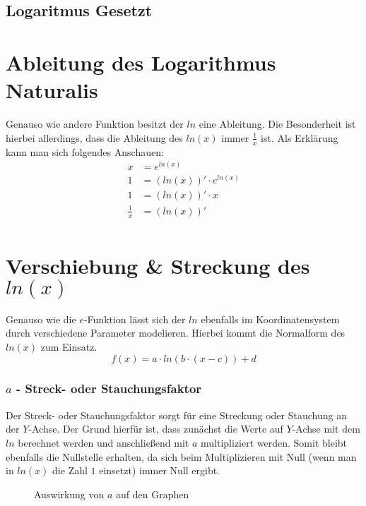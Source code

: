 \subsection{Logaritmus Gesetzt}
\pagebreak
\section{Ableitung des Logarithmus Naturalis}
Genauso wie andere Funktion besitzt der $ln$ eine Ableitung. Die Besonderheit ist hierbei allerdings, dass die Ableitung des $ln(x)$ immer $\frac{1}{x}$ ist. Als Erklärung kann man sich folgendes Anschauen:
\begin{align*}
	x&=e^{ln(x)}\tag{Ableiten auf beiden Seiten}\\
	1&=(ln(x))'\cdot e^{ln(x)}\tag{Beide Seiten vereinfachen}\\
	1&=(ln(x))'\cdot x\tag{Durch $x$ dividieren}\\
	\frac{1}{x}&=(ln(x))'\\	
\end{align*}
\section{Verschiebung \& Streckung des $ln(x)$}
Genauso wie die $e$-Funktion lässt sich der $ln$ ebenfalls im Koordinatensystem durch verschiedene Parameter modelieren. Hierbei kommt die Normalform des $ln(x)$ zum Einsatz.
\[f(x)=a\cdot ln(b\cdot(x-c))+d\]
\pagebreak
\subsubsection{$a$ - Streck- oder Stauchungsfaktor}
Der Streck- oder Stauchungsfaktor sorgt für eine Streckung oder Stauchung an der $Y$-Achse. Der Grund hierfür ist, dass zunächst die Werte auf $Y$-Achse mit dem $ln$ berechnet werden und anschließend mit $a$ multipliziert werden. Somit bleibt ebenfalls die Nullstelle erhalten, da sich beim Multiplizieren mit Null (wenn man in $ln(x)$ die Zahl $1$ einsetzt) immer Null ergibt. 
\begin{figure}[h]
\centering
	\caption{Auswirkung von $a$ auf den Graphen}
\end{figure}
\pagebreak
